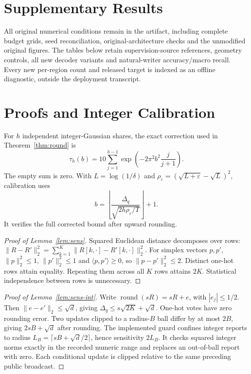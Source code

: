 \appendix

\section{Supplementary Results}
\label{app:full-results}

All original numerical conditions remain in the artifact, including complete
budget grids, seed reconciliation, original-architecture checks and the
unmodified original figures. The tables below retain supervision-source
references, geometry controls, all new decoder variants and natural-writer
accuracy/macro recall. Every new per-region count and released target is
indexed as an offline diagnostic, outside the deployment transcript.





\section{Proofs and Integer Calibration}
\label{app:proofs}

For $h$ independent integer-Gaussian shares, the exact correction used in
Theorem~\ref{thm:round} is
\begin{equation}
\tau_h(b)=10\sum_{j=1}^{h-1}\exp\!\left(-2\pi^2b^2\frac{j}{j+1}\right).
\label{eq:tau}
\end{equation}
The empty sum is zero. With $L=\log(1/\delta)$ and
$\rho_\varepsilon=(\sqrt{L+\varepsilon}-\sqrt L)^2$, calibration uses
\begin{equation}
b=\left\lfloor\frac{\Delta_q}{\sqrt{2h\rho_\varepsilon/T}}\right\rfloor+1.
\label{eq:integer-scale}
\end{equation}
It verifies the full corrected bound after upward rounding.

\begin{proof}[Proof of Lemma~\ref{lem:sens}]
Squared Euclidean distance decomposes over rows:
$\|R-R'\|_2^2=\sum_{k=1}^K\|R[k,\cdot]-R'[k,\cdot]\|_2^2$.
For simplex vectors $p,p'$, $\|p\|_2^2\le1$, $\|p'\|_2^2\le1$ and
$\langle p,p'\rangle\ge0$, so $\|p-p'\|_2^2\le2$.
Distinct one-hot rows attain equality. Repeating them across all $K$ rows
attains $2K$. Statistical independence between rows is unnecessary.
\end{proof}

\begin{proof}[Proof of Lemma~\ref{lem:sens-int}]
Write $\operatorname{round}(sR)=sR+e$, with $|e_j|\le1/2$.
Then $\|e-e'\|_2\le\sqrt d$, giving
$\Delta_q\le s\sqrt{2K}+\sqrt d$. One-hot votes have zero rounding error.
Two updates clipped to a radius-$B$ ball differ by at most $2B$,
giving $2sB+\sqrt d$ after rounding. The implemented guard confines
integer reports to radius $L_B=\lceil sB+\sqrt d/2\rceil$, hence sensitivity
$2L_B$. It checks squared integer norms exactly in the recorded numeric
range and replaces an out-of-ball report with zero.
Each conditional update is clipped relative to the same preceding public broadcast.
\end{proof}

